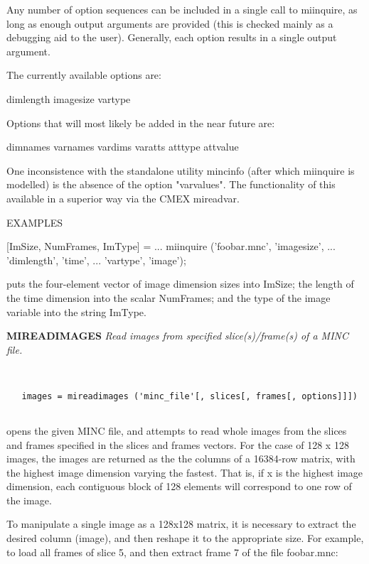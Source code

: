   Any number of option sequences can be included in a single call to 
  miinquire, as long as enough output arguments are provided (this is
  checked mainly as a debugging aid to the user).  Generally, each option
  results in a single output argument.
 
  The currently available options are:
 
      dimlength
      imagesize
      vartype
  
  Options that will most likely be added in the near future are:
 
      dimnames
      varnames
      vardims
      varatts
      atttype
      attvalue
 
  One inconsistence with the standalone utility mincinfo (after which 
  miinquire is modelled) is the absence of the option "varvalues".  
  The functionality of this available in a superior way via the CMEX
  mireadvar.
 
  EXAMPLES
 
   [ImSize, NumFrames, ImType] = ...
     miinquire ('foobar.mnc', 'imagesize', ...
                'dimlength', 'time', ...
                'vartype', 'image');
 
  puts the four-element vector of image dimension sizes into ImSize; 
  the length of the time dimension into the scalar NumFrames; and the
  type of the image variable into the string ImType.
\endfunchelp


{\large\bf MIREADIMAGES} {\em  Read images from specified slice(s)/frame(s) of a MINC file.}
\begin{verbatim}


   images = mireadimages ('minc_file'[, slices[, frames[, options]]])


\end{verbatim}

   opens the given MINC file, and attempts to read whole images from
   the slices and frames specified in the slices and frames vectors.
   For the case of 128 x 128 images, the images are returned as the 
   the columns of a 16384-row matrix, with the highest image dimension
   varying the fastest.  That is, if x is the highest image dimension,
   each contiguous block of 128 elements will correspond to one row
   of the image.
 
   To manipulate a single image as a 128x128 matrix, it is necessary
   to extract the desired column (image), and then reshape it to the
   appropriate size.  For example, to load all frames of slice 5, and 
   then extract frame 7 of the file foobar.mnc:

